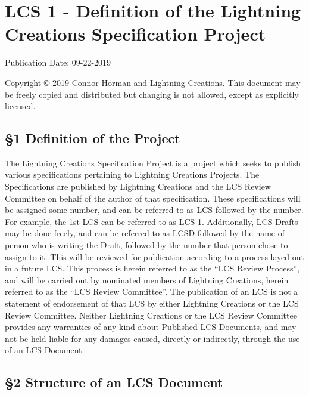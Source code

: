 \hypertarget{lcs-1---definition-of-the-lightning-creations-specification-project}{%
\section{LCS 1 - Definition of the Lightning Creations Specification
Project}\label{lcs-1---definition-of-the-lightning-creations-specification-project}}

Publication Date: 09-22-2019

Copyright © 2019 Connor Horman and Lightning Creations. This document
may be freely copied and distributed but changing is not allowed, except
as explicitly licensed.

\hypertarget{definition-of-the-project}{%
\subsection{§1 Definition of the
Project}\label{definition-of-the-project}}

The Lightning Creations Specification Project is a project which seeks
to publish various specifications pertaining to Lightning Creations
Projects. The Specifications are published by Lightning Creations and
the LCS Review Committee on behalf of the author of that specification.
These specifications will be assigned some number, and can be referred
to as LCS followed by the number. For example, the 1st LCS can be
referred to as LCS 1. Additionally, LCS Drafts may be done freely, and
can be referred to as LCSD followed by the name of person who is writing
the Draft, followed by the number that person chose to assign to it.
This will be reviewed for publication according to a process layed out
in a future LCS. This process is herein referred to as the ``LCS Review
Process'', and will be carried out by nominated members of Lightning
Creations, herein referred to as the ``LCS Review Committee''. The
publication of an LCS is not a statement of endorsement of that LCS by
either Lightning Creations or the LCS Review Committee. Neither
Lightning Creations or the LCS Review Committee provides any warranties
of any kind about Published LCS Documents, and may not be held liable
for any damages caused, directly or indirectly, through the use of an
LCS Document.

\hypertarget{structure-of-an-lcs-document}{%
\subsection{§2 Structure of an LCS
Document}\label{structure-of-an-lcs-document}}

